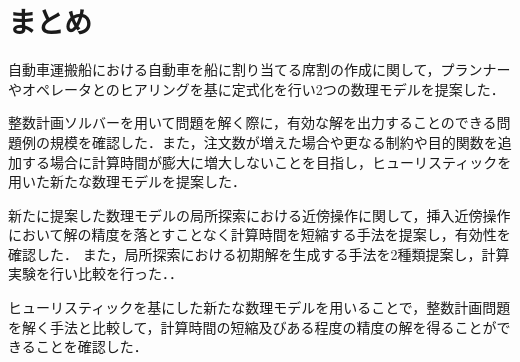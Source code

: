 \chapter{まとめ}\label{conclution}
自動車運搬船における自動車を船に割り当てる席割の作成に関して，プランナーやオペレータとのヒアリングを基に定式化を行い2つの数理モデルを提案した．

整数計画ソルバーを用いて問題を解く際に，有効な解を出力することのできる問題例の規模を確認した．また，注文数が増えた場合や更なる制約や目的関数を追加する場合に計算時間が膨大に増大しないことを目指し，ヒューリスティックを用いた新たな数理モデルを提案した．

新たに提案した数理モデルの局所探索における近傍操作に関して，挿入近傍操作において解の精度を落とすことなく計算時間を短縮する手法を提案し，有効性を確認した．
また，局所探索における初期解を生成する手法を2種類提案し，計算実験を行い比較を行った．．

ヒューリスティックを基にした新たな数理モデルを用いることで，整数計画問題を解く手法と比較して，計算時間の短縮及びある程度の精度の解を得ることができることを確認した．
